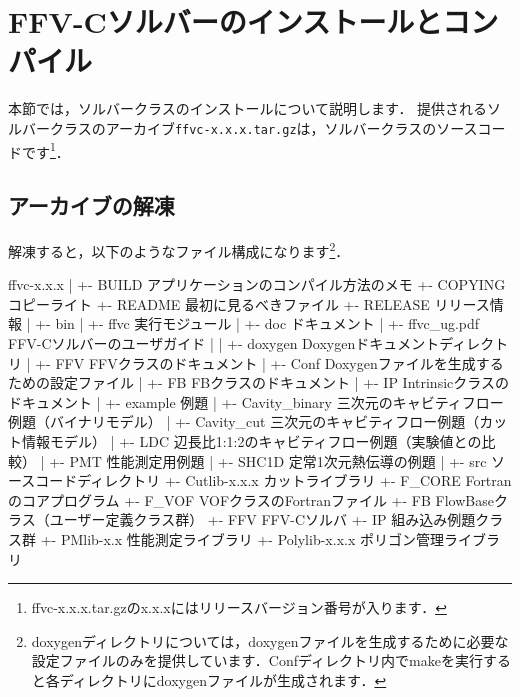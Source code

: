 \hypertarget{tgt:installFFV-C}{\section{FFV-Cソルバーのインストールとコンパイル}}

本節では，ソルバークラスのインストールについて説明します．
提供されるソルバークラスのアーカイブ\verb|ffvc-x.x.x.tar.gz|は，ソルバークラスのソースコードです\footnote{ffvc-x.x.x.tar.gzのx.x.xにはリリースバージョン番号が入ります．}．

\subsection{アーカイブの解凍}
{\small
{}
}

解凍すると，以下のようなファイル構成になります\footnote{doxygenディレクトリについては，doxygenファイルを生成するために必要な設定ファイルのみを提供しています．Confディレクトリ内でmakeを実行すると各ディレクトリにdoxygenファイルが生成されます．}．

{ \small
\begin{program}
ffvc-x.x.x
  |
  +- BUILD                        アプリケーションのコンパイル方法のメモ
  +- COPYING                      コピーライト
  +- README                       最初に見るべきファイル
  +- RELEASE                      リリース情報
  |
  +- bin                          
  |   +- ffvc                     実行モジュール
  |
  +- doc                          ドキュメント
  |   +- ffvc_ug.pdf              FFV-Cソルバーのユーザガイド
  |   
  |
  +- doxygen                      Doxygenドキュメントディレクトリ
  |   +- FFV                      FFVクラスのドキュメント
  |   +- Conf                     Doxygenファイルを生成するための設定ファイル
  |   +- FB                       FBクラスのドキュメント
  |   +- IP                       Intrinsicクラスのドキュメント
  |
  +- example                      例題
  |   +- Cavity_binary            三次元のキャビティフロー例題（バイナリモデル）
  |   +- Cavity_cut               三次元のキャビティフロー例題（カット情報モデル）
  |   +- LDC                      辺長比1:1:2のキャビティフロー例題（実験値との比較）
  |   +- PMT                      性能測定用例題
  |   +- SHC1D                    定常1次元熱伝導の例題
  |
  +- src                          ソースコードディレクトリ
      +- Cutlib-x.x.x             カットライブラリ
      +- F_CORE                   Fortranのコアプログラム
      +- F_VOF                    VOFクラスのFortranファイル
      +- FB                       FlowBaseクラス（ユーザー定義クラス群）
      +- FFV                      FFV-Cソルバ
      +- IP                       組み込み例題クラス群
      +- PMlib-x.x                性能測定ライブラリ
      +- Polylib-x.x.x            ポリゴン管理ライブラリ

\end{program}
}

